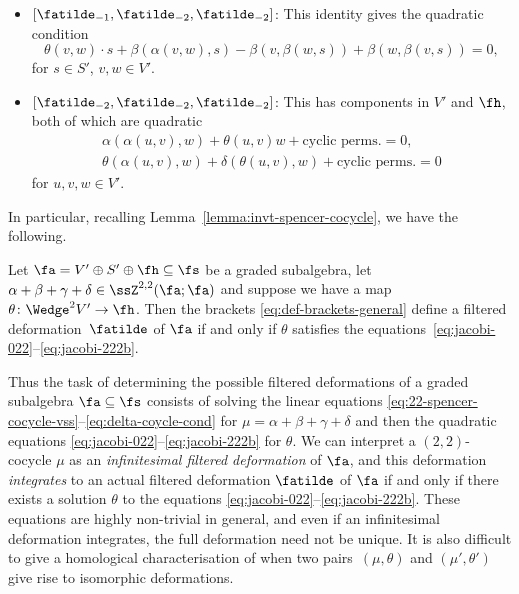\begin{itemize}
		\begin{equation}\label{eq:jacobi-112}
			\theta(\kappa_s,v) + \delta(\gamma(s,s),v) + 2\gamma(s,\beta(v,s)) = 0
		\end{equation}
	for $s\in S'$ and $v\in V'$.
	\item $[\fatilde_{-1},\fatilde_{-2},\fatilde_{-2}]$: This identity gives the quadratic condition
		\begin{equation}\label{eq:jacobi-122}
			\theta(v,w)\cdot s + \beta(\alpha(v,w),s) - \beta(v,\beta(w,s)) + \beta(w,\beta(v,s)) =0,
		\end{equation}
	for $s\in S'$, $v,w\in V'$.
	\item $[\fatilde_{-2},\fatilde_{-2},\fatilde_{-2}]$: This has components in $V'$ and $\fh$, both of which are quadratic
		\begin{gather}
			\alpha(\alpha(u,v),w)
				+ \theta(u,v)w
				+ \text{cyclic perms.} = 0,\label{eq:jacobi-222a}\\
			\theta(\alpha(u,v),w)
				+ \delta(\theta(u,v),w)
				+ \text{cyclic perms.} =0\label{eq:jacobi-222b}
		\end{gather}
	for $u,v,w\in V'$.
\end{itemize}

In particular, recalling Lemma~\ref{lemma:invt-spencer-cocycle}, we have the following.

\begin{Proposition}\label{prop:gen-filtered-defs-cocycle}
	Let $\fa=V'\oplus S'\oplus\fh\subseteq\fs$ be a graded subalgebra, let $\alpha+\beta+\gamma+\delta\in\ssZ^{2,2}(\fa;\fa)$ and suppose we have a map $\theta\colon\Wedge^2V'\to\fh$. Then the brackets \eqref{eq:def-brackets-general} define a filtered deformation~$\fatilde$ of $\fa$ if and only if $\theta$ satisfies the equations~\eqref{eq:jacobi-022}--\eqref{eq:jacobi-222b}.
\end{Proposition}

Thus the task of determining the possible filtered deformations of a graded subalgebra $\fa\subseteq\fs$ consists of solving the linear equations \eqref{eq:22-spencer-cocycle-vss}--\eqref{eq:delta-coycle-cond} for $\mu=\alpha+\beta+\gamma+\delta$ and then the quadratic equations \eqref{eq:jacobi-022}--\eqref{eq:jacobi-222b} for $\theta$. We can interpret a $(2,2)$-cocycle $\mu$ as an \emph{infinitesimal filtered deformation} of $\fa$, and this deformation \emph{integrates} to an actual filtered deformation $\fatilde$ of $\fa$ if and only if there exists a solution $\theta$ to the equations \eqref{eq:jacobi-022}--\eqref{eq:jacobi-222b}. These equations are highly non-trivial in general, and even if an infinitesimal deformation integrates, the full deformation need not be unique. It is also difficult to give a homological characterisation of when two pairs~$(\mu,\theta)$ and $(\mu',\theta')$ give rise to isomorphic deformations.

